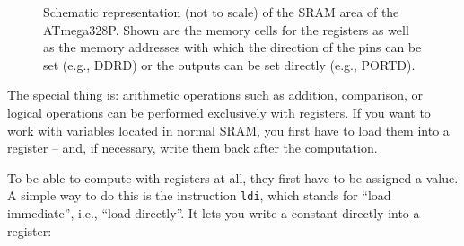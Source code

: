 \documentclass[a4paper,12pt]{article}
\begin{document}
\begin{figure}[htbp]
\begin{center}
{
} %
\end{center}
\caption{
    Schematic representation (not to scale) of the SRAM area of the
    ATmega328P. Shown are the memory cells for the registers as well as the
    memory addresses with which the direction of the pins can be set
    (e.g., DDRD) or the outputs can be set directly (e.g., PORTD).
}
\label{fig:sram-struktur}
\end{figure}

The special thing is: arithmetic operations such as addition, comparison, or
logical operations can be performed exclusively with registers. If you want
to work with variables located in normal SRAM, you first have to load them
into a register – and, if necessary, write them back after the computation.

\noindent
To be able to compute with registers at all, they first have to be assigned
a value. A simple way to do this is the instruction \texttt{ldi}, which
stands for ``load immediate'', i.e., ``load directly''. It lets you write a
constant directly into a register:
\end{document}
